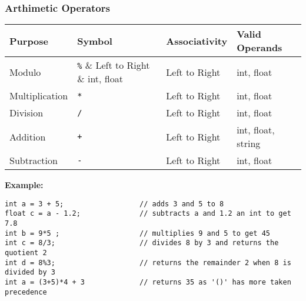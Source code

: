 \documentclass[english,a4paper,12pt]{report}
\begin{document}
\subsubsection{Arthimetic Operators}
\begin{center}
\renewcommand{\arraystretch}{1.5}%
\begin{tabular}{ |m{10em}|m{10em}|m{10em}|m{10em}| } 
\hline
Purpose & Symbol & Associativity & Valid Operands \\
\hline
Modulo & \verb|%| & Left to Right & int, float \\
\hline
Multiplication & \verb|*| & Left to Right & int, float \\
\hline
Division & \verb|/| & Left to Right & int, float \\
\hline
Addition & \verb|+| & Left to Right & int, float, string \\
\hline
Subtraction & \verb|-| & Left to Right & int, float \\
\hline
\end{tabular}
\end{center}
\textbf{Example:}
\begin{lstlisting}[style=CStyle]
int a = 3 + 5;                  // adds 3 and 5 to 8
float c = a - 1.2;              // subtracts a and 1.2 an int to get 7.8
int b = 9*5 ;                   // multiplies 9 and 5 to get 45
int c = 8/3;                    // divides 8 by 3 and returns the quotient 2
int d = 8%3;                    // returns the remainder 2 when 8 is divided by 3 
int a = (3+5)*4 + 3             // returns 35 as '()' has more taken precedence
\end{lstlisting}
\end{document}
